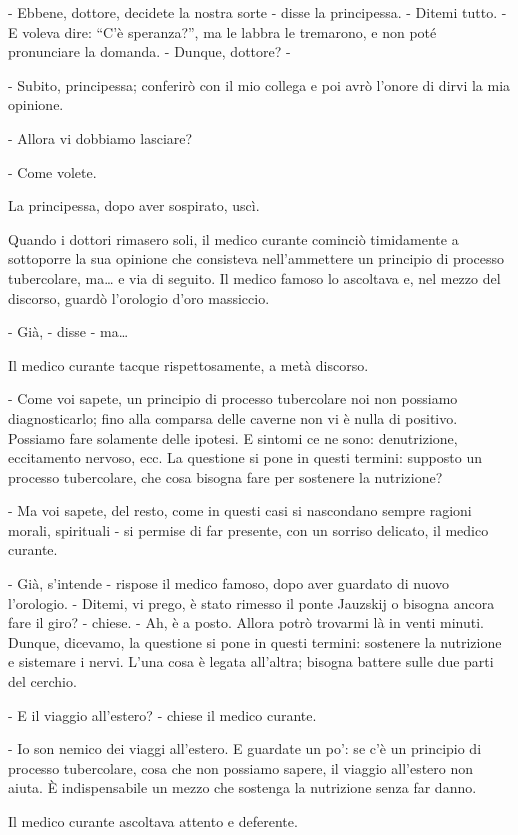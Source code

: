 - Ebbene, dottore, decidete la nostra sorte - disse la principessa. - Ditemi tutto. - E voleva dire: ``C'è speranza?'', ma le labbra le tremarono, e non poté pronunciare la domanda. - Dunque, dottore? - 

- Subito, principessa; conferirò con il mio collega e poi avrò l'onore di dirvi la mia opinione. 

- Allora vi dobbiamo lasciare? 

- Come volete. 

La principessa, dopo aver sospirato, uscì. 

Quando i dottori rimasero soli, il medico curante cominciò timidamente a sottoporre la sua opinione che consisteva nell'ammettere un principio di processo tubercolare, ma\ldots{} e via di seguito. Il medico famoso lo ascoltava e, nel mezzo del discorso, guardò l'orologio d'oro massiccio. 

- Già, - disse - ma\ldots{} 

Il medico curante tacque rispettosamente, a metà discorso. 

- Come voi sapete, un principio di processo tubercolare noi non possiamo diagnosticarlo; fino alla comparsa delle caverne non vi è nulla di positivo. Possiamo fare solamente delle ipotesi. E sintomi ce ne sono: denutrizione, eccitamento nervoso, ecc. La questione si pone in questi termini: supposto un processo tubercolare, che cosa bisogna fare per sostenere la nutrizione? 

- Ma voi sapete, del resto, come in questi casi si nascondano sempre ragioni morali, spirituali - si permise di far presente, con un sorriso delicato, il medico curante. 

- Già, s'intende - rispose il medico famoso, dopo aver guardato di nuovo l'orologio. - Ditemi, vi prego, è stato rimesso il ponte Jauzskij o bisogna ancora fare il giro? - chiese. - Ah, è a posto. Allora potrò trovarmi là in venti minuti. Dunque, dicevamo, la questione si pone in questi termini: sostenere la nutrizione e sistemare i nervi. L'una cosa è legata all'altra; bisogna battere sulle due parti del cerchio. 

- E il viaggio all'estero? - chiese il medico curante. 

- Io son nemico dei viaggi all'estero. E guardate un po': se c'è un principio di processo tubercolare, cosa che non possiamo sapere, il viaggio all'estero non aiuta. È indispensabile un mezzo che sostenga la nutrizione senza far danno. 

Il medico curante ascoltava attento e deferente. 

